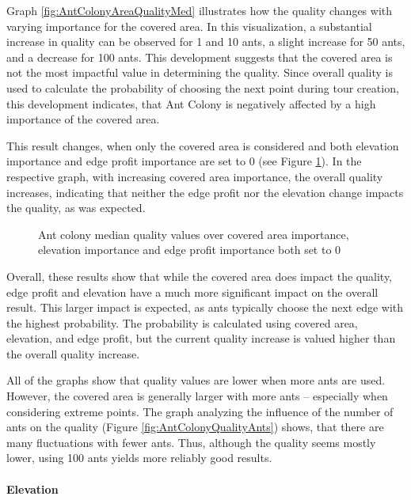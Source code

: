 Graph \ref{fig:AntColonyAreaQualityMed} illustrates how the quality changes with varying importance for the covered area.
In this visualization, a substantial increase in quality can be observed for 1 and 10 ants, a slight increase for 50 ants, and a decrease for 100 ants.
This development suggests that the covered area is not the most impactful value in determining the quality.
Since overall quality is used to calculate the probability of choosing the next point during tour creation, this development indicates, that Ant Colony is negatively affected by a high importance of the covered area.


This result changes, when only the covered area is considered and both elevation importance and edge profit importance are set to 0 (see Figure \ref{fig:AntColonyAreaOnlyQualityMed}).
In the respective graph, with increasing covered area importance, the overall quality increases, indicating that neither the edge profit nor the elevation change impacts the quality, as was expected.


\begin{figure}
	\centering
	
	\caption{Ant colony median quality values over covered area importance, elevation importance and edge profit importance both set to 0}
	\label{fig:AntColonyAreaOnlyQualityMed}
\end{figure}

Overall, these results show that while the covered area does impact the quality, edge profit and elevation have a much more significant impact on the overall result.
This larger impact is expected, as ants typically choose the next edge with the highest probability.
The probability is calculated using covered area, elevation, and edge profit, but the current quality increase is valued higher than the overall quality increase.

All of the graphs show that quality values are lower when more ants are used.
However, the covered area is generally larger with more ants -- especially when considering extreme points.
The graph analyzing the influence of the number of ants on the quality (Figure \ref{fig:AntColonyQualityAnts}) shows, that there are many fluctuations with fewer ants.
Thus, although the quality seems mostly lower, using 100 ants yields more reliably good results.

\paragraph{Elevation}


